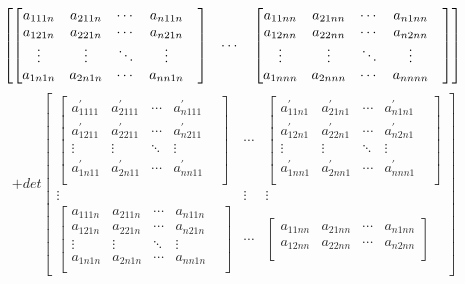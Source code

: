 \documentclass{amsc}          %
\numberwithin{equation}{section} %
\begin{document}
\begin{list}{}
$$\begin{bmatrix}
\begin{bmatrix}
  a_{111n}& a_{211n}&\cdots&a_{n11n}\\
  a_{121n}& a_{221n}&\cdots&a_{n21n}\\
  \vdots&\vdots&\ddots &\vdots& \\
   a_{1n1n}& a_{2n1n}&\cdots&a_{nn1n}\\
   \end{bmatrix}&
\cdots&
\begin{bmatrix}
  a_{11nn}& a_{21nn}&\cdots&a_{n1nn}\\
  a_{12nn}& a_{22nn}&\cdots&a_{n2nn}\\
  \vdots&\vdots&\ddots &\vdots& \\
   a_{1nnn}& a_{2nnn}&\cdots&a_{nnnn}\\
   \end{bmatrix}
    \end{bmatrix}
  \\$$
  $$+det
  \begin{bmatrix}
 \begin{bmatrix}
   a_{1111}^{'}& a_{2111}^{'}&\cdots&a_{n111}^{'}\\
   a_{1211}^{'}& a_{2211}^{'}&\cdots&a_{n211}^{'}\\
  \vdots&\vdots&\ddots &\vdots& \\
a_{1n11}^{'}& a_{2n11}^{'}&\cdots&a_{nn11}^{'}\\
\end{bmatrix}&
\cdots&
\begin{bmatrix}
  a_{11n1}^{'}& a_{21n1}^{'}&\cdots&a_{n1n1}^{'}\\
  a_{12n1}^{'}& a_{22n1}^{'}&\cdots&a_{n2n1}^{'}\\
  \vdots&\vdots&\ddots &\vdots& \\
 a_{1nn1}^{'}& a_{2nn1}^{'}&\cdots&a_{nnn1}^{'}\\
 \end{bmatrix}\\
\vdots&\vdots&\vdots\\
\begin{bmatrix}
  a_{111n}& a_{211n}&\cdots&a_{n11n}\\
  a_{121n}& a_{221n}&\cdots&a_{n21n}\\
  \vdots&\vdots&\ddots &\vdots& \\
   a_{1n1n}& a_{2n1n}&\cdots&a_{nn1n}\\
   \end{bmatrix}&
\cdots&
\begin{bmatrix}
  a_{11nn}& a_{21nn}&\cdots&a_{n1nn}\\
  a_{12nn}& a_{22nn}&\cdots&a_{n2nn}\\

\end{bmatrix}
\end{bmatrix}$$
\end{list}
\end{document}
